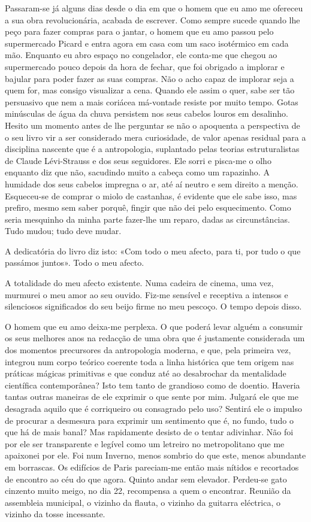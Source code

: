Passaram-se já alguns dias desde o dia em que o homem que eu amo me
ofereceu a sua obra revolucionária, acabada de escrever. Como sempre
sucede quando lhe peço para fazer compras para o jantar, o homem que eu
amo passou pelo supermercado Picard e entra agora em casa com um saco
isotérmico em cada mão. Enquanto eu abro espaço no congelador, ele
conta-me que chegou ao supermercado pouco depois da hora de fechar, que
foi obrigado a implorar e bajular para poder fazer as suas compras. Não
o acho capaz de implorar seja a quem for, mas consigo visualizar a cena.
Quando ele assim o quer, sabe ser tão persuasivo que nem a mais coriácea má-vontade resiste por muito tempo. Gotas minúsculas de água da
chuva persistem nos seus cabelos louros em desalinho. Hesito um momento
antes de lhe perguntar se não o apoquenta a perspectiva de o seu livro
vir a ser considerado mera curiosidade, de valor apenas residual para a
disciplina nascente que é a antropologia, suplantado pelas teorias
estruturalistas de Claude Lévi-Strauss e dos seus seguidores. Ele sorri
e pisca-me o olho enquanto diz que não, sacudindo muito a cabeça como um
rapazinho. A humidade dos seus cabelos impregna o ar, até aí neutro e
sem direito a menção. Esqueceu-se de comprar o miolo de castanhas, é
evidente que ele sabe isso, mas prefiro, mesmo sem saber porquê, fingir
que não dei pelo esquecimento. Como seria mesquinho da minha parte
fazer-lhe um reparo, dadas as circunstâncias. Tudo mudou; tudo deve mudar.

A dedicatória do livro diz isto: «Com todo o meu afecto, para ti, por
tudo o que passámos juntos». Todo o meu afecto.


A totalidade do meu afecto existente. Numa cadeira de cinema, uma vez,
murmurei o meu amor ao seu ouvido. Fiz-me sensível e receptiva a
intensos e silenciosos significados do seu beijo firme no meu pescoço. O
tempo depois disso.

O homem que eu amo deixa-me perplexa. O que poderá levar alguém a
consumir os seus melhores anos na redacção de uma obra que é justamente
considerada um dos momentos precursores da antropologia moderna, e que,
pela primeira vez, integrou num corpo teórico coerente toda a linha
histórica que tem origem nas práticas mágicas primitivas e que conduz
até ao desabrochar da mentalidade científica contemporânea? Isto tem
tanto de grandioso como de doentio. Haveria tantas outras maneiras de
ele exprimir o que sente por mim. Julgará ele que me desagrada aquilo
que é corriqueiro ou consagrado pelo uso? Sentirá ele o impulso de
procurar a desmesura para exprimir um sentimento que é, no fundo, tudo o
que há de mais banal? Mas rapidamente desisto de o tentar adivinhar. Não
foi por ele ser transparente e legível como um letreiro no metropolitano
que me apaixonei por ele. Foi num Inverno, menos sombrio do que este,
menos abundante em borrascas. Os edifícios de Paris pareciam-me então
mais nítidos e recortados de encontro ao céu do que agora. Quinto andar
sem elevador. Perdeu-se gato cinzento muito meigo, no dia 22, recompensa
a quem o encontrar. Reunião da assembleia municipal, o vizinho da
flauta, o vizinho da guitarra eléctrica, o vizinho da tosse incessante.

